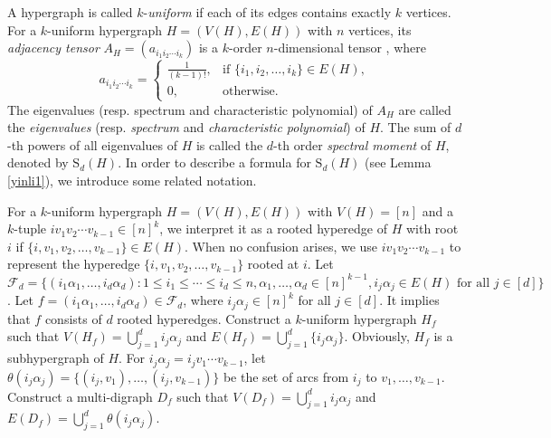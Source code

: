 \documentclass{article}
\begin{document}
A hypergraph is called $k$-\emph{uniform} if each of its edges contains exactly $k$ vertices.
For a $k$-uniform hypergraph $H=(V(H),E(H))$ with $n$ vertices,
its \emph{adjacency tensor} $A_{H}=(a_{i_{1}i_{2}\cdots i_{k}})$ is a $k$-order $n$-dimensional tensor \cite{cooper2012spectra},
where
\begin{equation*}
a_{i_{1}i_{2}\cdots i_{k}}=\begin{cases}
\frac{1}{(k-1)!},&\text{if $\{i_{1},i_{2},\ldots,i_{k}\}\in E(H)$},\\
0,&\text{otherwise}.
\end{cases}
\end{equation*}
The eigenvalues (resp. spectrum and characteristic polynomial) of $A_{H}$ are called the \emph{eigenvalues} (resp. \emph{spectrum} and \emph{characteristic polynomial}) of $H$.
The sum of $d$-th powers of all eigenvalues of $H$ is called the $d$-th order \emph{spectral moment} of $H$,
denoted by $\mathrm{S}_{d}(H)$.
In order to describe a formula for $\mathrm{S}_{d}(H)$ (see Lemma \ref{yinli1}),
we introduce some related notation.

For a $k$-uniform hypergraph $H=(V(H),E(H))$ with $V(H)=[n]$ and a $k$-tuple $i v_1v_2\cdots v_{k-1}\in [n]^k$,
we interpret it as a rooted hyperedge of $H$ with root $i$ if $\{i, v_1,v_2,\ldots,v_{k-1}\} \in E(H)$.
When no confusion arises,
we use $i v_1v_2\cdots v_{k-1}$ to represent the hyperedge $\{i, v_1,v_2,\ldots,v_{k-1}\}$ rooted at $i$.
Let $\mathcal{F}_{d}=\{ (i_{1}\alpha_{1},\ldots,i_{d}\alpha_{d}): 1 \leq i_{1} \leq \cdots\leq i_{d} \leq n, \alpha_{1},\ldots,\alpha_{d}\in[n]^{k-1}, i_j\alpha_j \in E(H) \mbox{ for all $j \in [d]$} \}$.
Let $f=(i_{1}\alpha_{1},\ldots,i_{d}\alpha_{d})\in\mathcal{F}_{d}$,
where $i_{j}\alpha_{j}\in [n]^{k}$ for all $j \in [d]$.
It implies that $f$ consists of $d$ rooted hyperedges.
Construct a $k$-uniform hypergraph $H_{f}$ such that $V(H_{f})=\bigcup_{j=1}^{d}i_j\alpha_j$ and $E(H_{f})=\bigcup_{j=1}^{d}\{i_j\alpha_j\}$.
Obviously, $H_{f}$ is a subhypergraph of $H$.
For $i_{j}\alpha_{j}=i_{j}v_{1}\cdots v_{k-1}$,
let $\theta(i_{j}\alpha_{j})=\{(i_{j},v_{1}),\ldots,(i_{j},v_{k-1})\}$ be the set of arcs from $i_{j}$ to $v_{1},\ldots,v_{k-1}$.
Construct a multi-digraph $D_{f}$ such that $V(D_{f})=\bigcup_{j=1}^{d}i_j\alpha_j$ and $E(D_f)=\bigcup_{j=1}^{d}\theta(i_{j}\alpha_{j})$.
\end{document}
